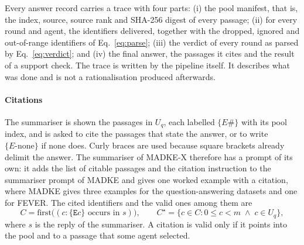 Every answer record carries a trace with four parts: (i) the pool manifest, that is, the index, source, source rank and SHA-256 digest of every passage; (ii) for every round and agent, the identifiers delivered, together with the dropped, ignored and out-of-range identifiers of Eq.~\eqref{eq:parse}; (iii) the verdict of every round as parsed by Eq.~\eqref{eq:verdict}; and (iv) the final answer, the passages it cites and the result of a support check. The trace is written by the pipeline itself. It describes what was done and is not a rationalisation produced afterwards.

\paragraph{Citations}
The summariser is shown the passages in $U_q$, each labelled $\{E\#\}$ with its pool index, and is asked to cite the passages that state the answer, or to write $\{E\text{-none}\}$ if none does. Curly braces are used because square brackets already delimit the answer. The summariser of MADKE-X therefore has a prompt of its own: it adds the list of citable passages and the citation instruction to the summariser prompt of MADKE and gives one worked example with a citation, where MADKE gives three examples for the question-answering datasets and one for FEVER. The cited identifiers and the valid ones among them are
\begin{equation}
C = \mathrm{first}\big((c : \texttt{\{E}c\texttt{\}} \text{ occurs in } s)\big),
\qquad
C^\star = \{c\in C : 0\le c<m \;\wedge\; c\in U_q\},
\label{eq:cite}
\end{equation}
where $s$ is the reply of the summariser. A citation is valid only if it points into the pool and to a passage that some agent selected.

